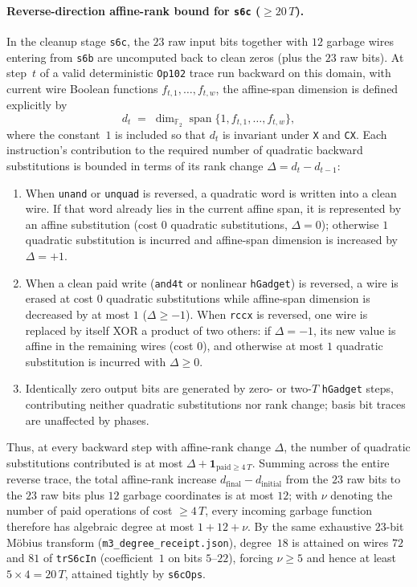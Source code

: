 \documentclass[11pt,a4paper]{article}
\theoremstyle{definition}
\theoremstyle{remark}
\begin{document}
\paragraph{Reverse-direction affine-rank bound for \texttt{s6c} (\(\ge 20\,T\)).}
In the cleanup stage \texttt{s6c}, the \(23\) raw input bits together with \(12\) garbage wires entering from \texttt{s6b} are uncomputed back to clean zeros (plus the \(23\) raw bits). At step~\(t\) of a valid deterministic \texttt{Op102} trace run backward on this domain, with current wire Boolean functions \(f_{t,1}, \dots, f_{t,w}\), the affine-span dimension is defined explicitly by
\[
  d_t \;=\; \dim_{\mathbb{F}_2}\operatorname{span}\{1, f_{t,1}, \dots, f_{t,w}\},
\]
where the constant~\(1\) is included so that \(d_t\) is invariant under \texttt{X} and \texttt{CX}. Each instruction's contribution to the required number of quadratic backward substitutions is bounded in terms of its rank change \(\Delta = d_t - d_{t-1}\):
\begin{enumerate}
\item When \texttt{unand} or \texttt{unquad} is reversed, a quadratic word is written into a clean wire. If that word already lies in the current affine span, it is represented by an affine substitution (cost \(0\) quadratic substitutions, \(\Delta = 0\)); otherwise \(1\) quadratic substitution is incurred and affine-span dimension is increased by \(\Delta = +1\).
\item When a clean paid write (\texttt{and4t} or nonlinear \texttt{hGadget}) is reversed, a wire is erased at cost \(0\) quadratic substitutions while affine-span dimension is decreased by at most \(1\) (\(\Delta \ge -1\)). When \texttt{rccx} is reversed, one wire is replaced by itself XOR a product of two others: if \(\Delta = -1\), its new value is affine in the remaining wires (cost \(0\)), and otherwise at most \(1\) quadratic substitution is incurred with \(\Delta \ge 0\).
\item Identically zero output bits are generated by zero- or two-\(T\) \texttt{hGadget} steps, contributing neither quadratic substitutions nor rank change; basis bit traces are unaffected by phases.
\end{enumerate}
Thus, at every backward step with affine-rank change \(\Delta\), the number of quadratic substitutions contributed is at most \(\Delta + \mathbf{1}_{\text{paid}\ge 4\,T}\). Summing across the entire reverse trace, the total affine-rank increase \(d_{\mathrm{final}} - d_{\mathrm{initial}}\) from the \(23\) raw bits to the \(23\) raw bits plus \(12\) garbage coordinates is at most \(12\); with \(\nu\) denoting the number of paid operations of cost \(\ge 4\,T\), every incoming garbage function therefore has algebraic degree at most \(1 + 12 + \nu\). By the same exhaustive \(23\)-bit M\"obius transform (\texttt{m3\_degree\_receipt.json}), degree~\(18\) is attained on wires \(72\) and \(81\) of \texttt{trS6cIn} (coefficient~\(1\) on bits \(5\text{--}22\)), forcing \(\nu \ge 5\) and hence at least \(5 \times 4 = 20\,T\), attained tightly by \texttt{s6cOps}.
\end{document}
